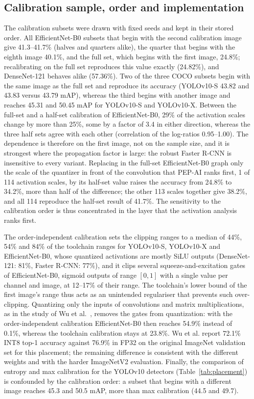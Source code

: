 \documentclass[pdflatex,sn-mathphys-num]{sn-jnl}%
\theoremstyle{thmstyleone}%
\theoremstyle{thmstyletwo}%
\theoremstyle{thmstylethree}%
\begin{document}
\begin{appendices}
\subsection{Calibration sample, order and implementation}\label{sec:supp-res-calib}
The calibration subsets were drawn with fixed seeds and kept in their stored order. All EfficientNet-B0 subsets that begin with the second calibration image give 41.3--41.7\% (halves and quarters alike), the quarter that begins with the eighth image 40.1\%, and the full set, which begins with the first image, 24.8\%; recalibrating on the full set reproduces this value exactly (24.82\%), and DenseNet-121 behaves alike (57.36\%). Two of the three COCO subsets begin with the same image as the full set and reproduce its accuracy (YOLOv10-S 43.82 and 43.83 versus 43.79 mAP), whereas the third begins with another image and reaches 45.31 and 50.45 mAP for YOLOv10-S and YOLOv10-X. Between the full-set and a half-set calibration of EfficientNet-B0, 29\% of the activation scales change by more than 25\%, some by a factor of 3.4 in either direction, whereas the three half sets agree with each other (correlation of the log-ratios 0.95--1.00). The dependence is therefore on the first image, not on the sample size, and it is strongest where the propagation factor is large: the robust Faster R-CNN is insensitive to every variant. Replacing in the full-set EfficientNet-B0 graph only the scale of the quantizer in front of the convolution that PEP-AI ranks first, 1 of 114 activation scales, by its half-set value raises the accuracy from 24.8\% to 34.2\%, more than half of the difference; the other 113 scales together give 38.2\%, and all 114 reproduce the half-set result of 41.7\%. The sensitivity to the calibration order is thus concentrated in the layer that the activation analysis ranks first.

The order-independent calibration sets the clipping ranges to a median of 44\%, 54\% and 84\% of the toolchain ranges for YOLOv10-S, YOLOv10-X and EfficientNet-B0, whose quantized activations are mostly SiLU outputs (DenseNet-121: 81\%, Faster R-CNN: 77\%), and it clips several squeeze-and-excitation gates of EfficientNet-B0, sigmoid outputs of range $[0,1]$ with a single value per channel and image, at 12--17\% of their range. The toolchain's lower bound of the first image's range thus acts as an unintended regulariser that prevents such over-clipping. Quantizing only the inputs of convolutions and matrix multiplications, as in the study of Wu et al.~\cite{wu2020integer}, removes the gates from quantization: with the order-independent calibration EfficientNet-B0 then reaches 54.9\% instead of 0.1\%, whereas the toolchain calibration stays at 23.8\%. Wu et al. report 72.1\% INT8 top-1 accuracy against 76.9\% in FP32 on the original ImageNet validation set for this placement; the remaining difference is consistent with the different weights and with the harder ImageNetV2 evaluation. Finally, the comparison of entropy and max calibration for the YOLOv10 detectors (Table~\ref{tab:placement}) is confounded by the calibration order: a subset that begins with a different image reaches 45.3 and 50.5 mAP, more than max calibration (44.5 and 49.7).


\end{appendices}
\end{document}
